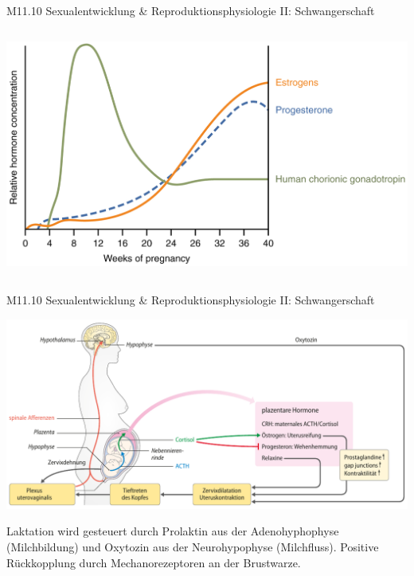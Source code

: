 \documentclass{beamer}
\begin{document}
\begin{frame}{M11.10 Sexualentwicklung \& Reproduktionsphysiologie II: Schwangerschaft}
\begin{columns}[c]
\begin{column}{5cm}


\begin{center}
\includegraphics[width=\textwidth]{pregnancy_hormones.png}    
\end{center}



\end{column}

\end{columns}


\end{frame} 

\begin{frame}{M11.10 Sexualentwicklung \& Reproduktionsphysiologie II: Schwangerschaft}
    
    \begin{center}
        \includegraphics[width=\textwidth]{geburt_hormone.png}
    \end{center}
    
    \pause
    
    Laktation wird gesteuert durch Prolaktin aus der Adenohyphophyse (Milchbildung) und Oxytozin aus der Neurohypophyse (Milchfluss). Positive Rückkopplung durch Mechanorezeptoren an der Brustwarze. 
    
    
\end{frame}
\end{document}
